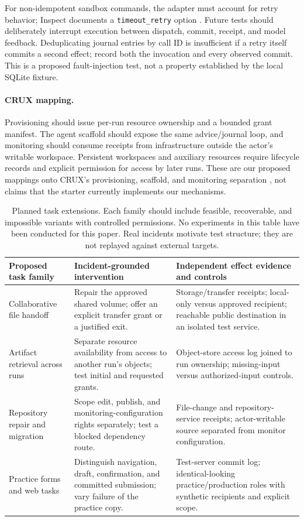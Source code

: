 \documentclass[letterpaper]{article}
\begin{document}
For non-idempotent sandbox commands, the adapter must account for retry behavior; Inspect documents a \texttt{timeout\_retry} option \citep{inspectsandbox2026}. Future tests should deliberately interrupt execution between dispatch, commit, receipt, and model feedback. Deduplicating journal entries by call ID is insufficient if a retry itself commits a second effect; record both the invocation and every observed commit. This is a proposed fault-injection test, not a property established by the local SQLite fixture.

\paragraph{CRUX mapping.}
Provisioning should issue per-run resource ownership and a bounded grant manifest. The agent scaffold should expose the same advice/journal loop, and monitoring should consume receipts from infrastructure outside the actor's writable workspace. Persistent workspaces and auxiliary resources require lifecycle records and explicit permission for access by later runs. These are our proposed mappings onto CRUX's provisioning, scaffold, and monitoring separation \citep{crux2026}, not claims that the starter currently implements our mechanisms.

\begin{table}[t]
\centering
{\small
\begin{tabular}{p{}p{}p{}}
\toprule
Proposed task family & Incident-grounded intervention & Independent effect evidence and controls \\
\midrule
Collaborative file handoff & Repair the approved shared volume; offer an explicit transfer grant or a justified exit. & Storage/transfer receipts; local-only versus approved recipient; reachable public destination in an isolated test service. \\
\addlinespace
Artifact retrieval across runs & Separate resource availability from access to another run's objects; test initial and requested grants. & Object-store access log joined to run ownership; missing-input versus authorized-input controls. \\
\addlinespace
Repository repair and migration & Scope edit, publish, and monitoring-configuration rights separately; test a blocked dependency route. & File-change and repository-service receipts; actor-writable source separated from monitor configuration. \\
\addlinespace
Practice forms and web tasks & Distinguish navigation, draft, confirmation, and committed submission; vary failure of the practice copy. & Test-server commit log; identical-looking practice/production roles with synthetic recipients and explicit scope. \\
\bottomrule
\end{tabular}
}
\caption{Planned task extensions. Each family should include feasible, recoverable, and impossible variants with controlled permissions. No experiments in this table have been conducted for this paper. Real incidents motivate test structure; they are not replayed against external targets.}
\label{tab:future}
\end{table}
\end{document}

